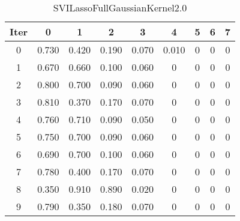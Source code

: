 \begin{table}
	\begin{center}
		\begin{tabular}{|c|c|c|c|c|c|c|c|c|}
			\hline
			Iter & 0 & 1 & 2 & 3 & 4 & 5 & 6 & 7 \\
			\hline
			0 & 0.730 & 0.420 & 0.190 & 0.070 & 0.010 & 0 & 0 & 0 \\
			\hline
			1 & 0.670 & 0.660 & 0.100 & 0.060 & 0 & 0 & 0 & 0 \\
			\hline
			2 & 0.800 & 0.700 & 0.090 & 0.060 & 0 & 0 & 0 & 0 \\
			\hline
			3 & 0.810 & 0.370 & 0.170 & 0.070 & 0 & 0 & 0 & 0 \\
			\hline
			4 & 0.760 & 0.710 & 0.090 & 0.050 & 0 & 0 & 0 & 0 \\
			\hline
			5 & 0.750 & 0.700 & 0.090 & 0.060 & 0 & 0 & 0 & 0 \\
			\hline
			6 & 0.690 & 0.700 & 0.100 & 0.060 & 0 & 0 & 0 & 0 \\
			\hline
			7 & 0.780 & 0.400 & 0.170 & 0.070 & 0 & 0 & 0 & 0 \\
			\hline
			8 & 0.350 & 0.910 & 0.890 & 0.020 & 0 & 0 & 0 & 0 \\
			\hline
			9 & 0.790 & 0.350 & 0.180 & 0.070 & 0 & 0 & 0 & 0 \\
			\hline
		\end{tabular}
	\end{center}
	\caption{SVILassoFullGaussianKernel2.0}
\end{table}